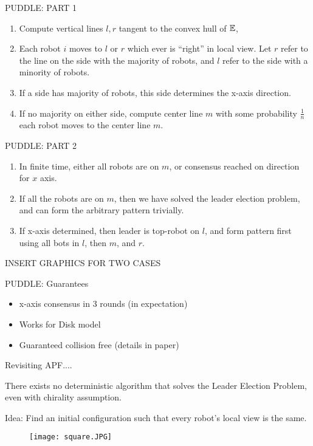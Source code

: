 \documentclass{beamer}
\begin{document}
\begin{frame}{PUDDLE: PART 1}
	\begin{enumerate}
		\item Compute vertical lines $l,r$ tangent to the convex hull of $\EE$, 
		\item Each robot $i$ moves to $l$ or $r$ which ever is ``right'' in local view.
		Let $r$ refer to the line on the side with the majority of robots, and $l$ refer to the side
		with a minority of robots.
		\item If a side has majority of robots, this side determines the x-axis direction.
		\item If  no majority on either side, compute center line $m$ 
			with some probability $\frac{1}{n}$ each robot moves to the center line $m$. 
	\end{enumerate}
		\begin{tikzpicture}[scale=0.35]
		\end{tikzpicture}
\end{frame}

\begin{frame}{PUDDLE: PART 2}
	\begin{enumerate}
		\item In finite time, either all robots are on $m$,
		or consensus reached on direction for $x$ axis.
		\item If all the robots are on $m$, then we have solved the leader election problem, and 
		can form the arbitrary pattern trivially.
		\item If x-axis determined, then leader is top-robot on $l$, and form pattern first using
		all bots in $l$, then $m$, and $r$.
	\end{enumerate}
	INSERT GRAPHICS FOR TWO CASES
\end{frame}

\begin{frame}{PUDDLE: Guarantees }
	\begin{itemize}
		\item x-axis consensus in 3 rounds (in expectation)
		\item Works for Disk model
		\item Guaranteed collision free (details in paper)
	\end{itemize}
\end{frame}

\begin{frame}{Revisiting APF....}
\begin{theorem}
There exists no deterministic algorithm that solves the Leader Election Problem, even with chirality assumption.
\end{theorem}
\pause
Idea: Find an initial configuration such that every robot's local view is the same. 
\pause
\begin{figure}[ht!]
\centering
\texttt{[image: square.JPG]}
\end{figure}
\end{frame}
\end{document}

